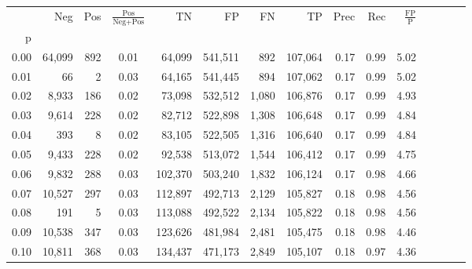 \begin{tabular}{rrrcrrrrrrrrrrr}
\toprule
{} &     Neg &     Pos & $\frac{\text{Pos}}{\text{Neg}+\text{Pos}}$ &       TN &       FP &       FN &       TP &  Prec &   Rec & $\frac{\text{FP}}{\text{P}}$ \\
p    &         &         &                                            &          &          &          &          &       &       &                              \\
\midrule
0.00 &  64,099 &     892 &                                       0.01 &   64,099 &  541,511 &      892 &  107,064 &  0.17 &  0.99 &                         5.02 \\
0.01 &      66 &       2 &                                       0.03 &   64,165 &  541,445 &      894 &  107,062 &  0.17 &  0.99 &                         5.02 \\
0.02 &   8,933 &     186 &                                       0.02 &   73,098 &  532,512 &    1,080 &  106,876 &  0.17 &  0.99 &                         4.93 \\
0.03 &   9,614 &     228 &                                       0.02 &   82,712 &  522,898 &    1,308 &  106,648 &  0.17 &  0.99 &                         4.84 \\
0.04 &     393 &       8 &                                       0.02 &   83,105 &  522,505 &    1,316 &  106,640 &  0.17 &  0.99 &                         4.84 \\
0.05 &   9,433 &     228 &                                       0.02 &   92,538 &  513,072 &    1,544 &  106,412 &  0.17 &  0.99 &                         4.75 \\
0.06 &   9,832 &     288 &                                       0.03 &  102,370 &  503,240 &    1,832 &  106,124 &  0.17 &  0.98 &                         4.66 \\
0.07 &  10,527 &     297 &                                       0.03 &  112,897 &  492,713 &    2,129 &  105,827 &  0.18 &  0.98 &                         4.56 \\
0.08 &     191 &       5 &                                       0.03 &  113,088 &  492,522 &    2,134 &  105,822 &  0.18 &  0.98 &                         4.56 \\
0.09 &  10,538 &     347 &                                       0.03 &  123,626 &  481,984 &    2,481 &  105,475 &  0.18 &  0.98 &                         4.46 \\
0.10 &  10,811 &     368 &                                       0.03 &  134,437 &  471,173 &    2,849 &  105,107 &  0.18 &  0.97 &                         4.36 \\

\end{tabular}
